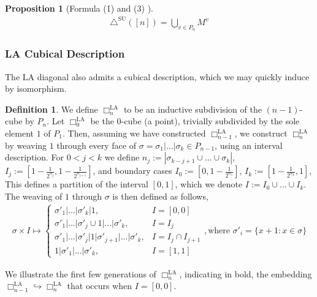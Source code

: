 \documentclass{amsart}
\newcommand{\darkblue}{\color{darkblue}} %
\newtheorem{proposition}[theorem]{Proposition}
\theoremstyle{definition}
\newtheorem{definition}[theorem]{Definition}
\newcommand{\defn}[1]{\textsl{\darkblue #1}} %
\newcommand{\LA}{\mathrm{LA}}
\newcommand{\SUD}{\triangle^{\mathrm{SU}}}
\newcommand{\divcube}[1]{\Box_{#1}}
\newcommand{\maxsubdivpairsv}{M^v}
\begin{document}
\begin{proposition}[Formula (1) and (3) \cite{saneblidzeComparingDiagonalsAssociahedra2022}]
\begin{align*}
    \SUD([n]) = \bigcup_{v \in P_n} \maxsubdivpairsv
\end{align*}
\end{proposition}

\subsubsection{LA Cubical Description}

The $\LA$ diagonal also admits a cubical description, which we may quickly induce by isomorphism.

\begin{definition}
We define \defn{$\divcube{n}^{\LA}$} to be an inductive subdivision of the $(n-1)$-cube by $P_n$.
Let $\divcube{0}^{\LA}$ be the $0$-cube (a point), trivially subdivided by the sole element $1$ of $P_1$.
Then, assuming we have constructed $\divcube{n-1}^{\LA}$, we construct $\divcube{n}^{\LA}$ by weaving $1$ through every face of $\sigma = \sigma_1|...|\sigma_k \in P_{n-1}$, using an interval description.
For $0<j<k$ we define
$n_j := |\sigma_{k-j+1}\cup...\cup \sigma_k|$, $I_j := [1 - \frac{1}{2^{n_j}}, 1 - \frac{1}{2^{n_{j+1}}}]$, and boundary cases $I_0:= [0,1 - \frac{1}{2^{n_1}}]$, $I_k:= [1 - \frac{1}{2^{n_k}},1]$,
This defines a partition of the interval $[0,1]$, which we denote $I := I_0 \cup ... \cup I_k$.
The weaving of $1$ through $\sigma$ is then defined as follows,
\begin{align} \label{eq:In LA inductive def}
    \sigma \times I \mapsto 
    \begin{cases}
        \sigma'_1|...|\sigma'_k| 1, &I = [0, 0]\\
        \sigma'_1|...|\sigma'_j \cup 1|...|\sigma'_k, &I = I_j\\
        \sigma'_1|...|\sigma'_j|1|\sigma'_{j+1}|...|\sigma'_k, &I = I_j \cap I_{j+1}\\
        1|\sigma'_1|...|\sigma'_k, &I = [1, 1]
    \end{cases}
    , \text{where } \sigma'_i = \{x+1:x\in \sigma\}
\end{align}
\end{definition}

We illustrate the first few generations of $\divcube{n}^{\LA}$, indicating in bold, the embedding $\divcube{n-1}^{\LA}\hookrightarrow \divcube{n}^{\LA}$ that occurs when $I = [0, 0]$.
\end{document}
